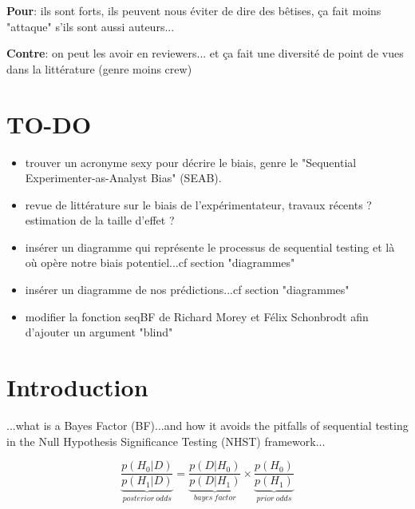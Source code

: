 \documentclass[a4paper,man,natbib,floatsintext]{apa6}
\begin{document}
\textbf{Pour}: ils sont forts, ils peuvent nous éviter de dire des bêtises, ça fait moins "attaque" s'ils sont aussi auteurs...

\textbf{Contre}: on peut les avoir en reviewers... et ça fait une diversité de point de vues dans la littérature (genre moins crew)

\section{TO-DO}

\begin{itemize}

\item{trouver un acronyme sexy pour décrire le biais, genre le "Sequential Experimenter-as-Analyst Bias" (SEAB).} 

\item{revue de littérature sur le biais de l'expérimentateur, travaux récents ? estimation de la taille d'effet ?}

\item{insérer un diagramme qui représente le processus de sequential testing et là où opère notre biais potentiel...cf section "diagrammes"}

\item{insérer un diagramme de nos prédictions...cf section "diagrammes"}

\item{modifier la fonction seqBF de Richard Morey et Félix Schonbrodt afin d'ajouter un argument "blind"} 

\end{itemize}

\section{Introduction}

...what is a Bayes Factor (BF)...and how it avoids the pitfalls of sequential testing  in the Null Hypothesis Significance Testing (NHST) framework...

\begin{equation}
\underbrace{\dfrac{p(H_{0}|D)}{p(H_{1}|D)}}_{posterior\ odds} = \underbrace{\dfrac{p(D|H_{0})}{p(D|H_{1})}}_{bayes\ factor} \times \underbrace{\dfrac{p(H_{0})}{p(H_{1})}}_{prior\ odds}
\end{equation}

\vspace{5mm}
\end{document}
